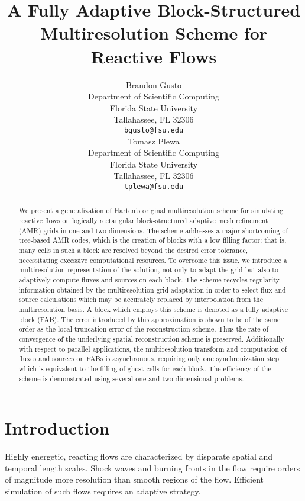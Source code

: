 \documentclass[]{article}
\title{A Fully Adaptive Block-Structured Multiresolution Scheme for Reactive Flows}
\author{
  Brandon Gusto\\
  Department of Scientific Computing\\
  Florida State University\\
  Tallahassee, FL 32306 \\
  \texttt{bgusto@fsu.edu} \\
  \And
  Tomasz Plewa \\
  Department of Scientific Computing\\
  Florida State University\\
  Tallahassee, FL 32306 \\
  \texttt{tplewa@fsu.edu} \\
}
\begin{document}
\maketitle

\begin{abstract}
    We present a generalization of Harten's original multiresolution scheme for
    simulating reactive flows on logically rectangular block-structured adaptive
    mesh refinement (AMR) grids in one and two dimensions. The scheme addresses
    a major shortcoming of tree-based AMR codes, which is the creation of blocks
    with a low filling factor; that is, many cells in such a block are resolved
    beyond the desired error tolerance, necessitating excessive computational
    resources.  To overcome this issue, we introduce a multiresolution
    representation of the solution, not only to adapt the grid but also to
    adaptively compute fluxes and sources on each block. The scheme recycles
    regularity information obtained by the multiresolution grid adaptation in
    order to select flux and source calculations which may be accurately
    replaced by interpolation from the multiresolution basis. A block which
    employs this scheme is denoted as a fully adaptive block (FAB).  The error
    introduced by this approximation is shown to be of the same order as the
    local truncation error of the reconstruction scheme. Thus the rate of
    convergence of the underlying spatial reconstruction scheme is preserved.
    Additionally with respect to parallel applications, the multiresolution
    transform and computation of fluxes and sources on FABs is asynchronous,
    requiring only one synchronization step which is equivalent to the filling
    of ghost cells for each block. The efficiency of the scheme is demonstrated
    using several one and two-dimensional problems.
\end{abstract}


\section{Introduction}

    Highly energetic, reacting flows are characterized by disparate spatial and
    temporal length scales. Shock waves and burning fronts in the flow require
    orders of magnitude more resolution than smooth regions of the flow.
    Efficient simulation of such flows requires an adaptive strategy.
\end{document}
